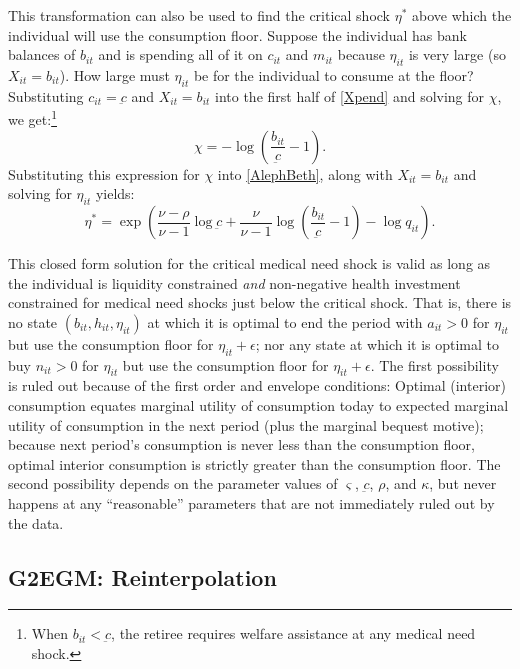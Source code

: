 \documentclass[12pt,pdftex,letterpaper]{article}
\newcommand{\Health}{h}
\newcommand{\Con}{c}
\newcommand{\Care}{m}
\newcommand{\Invst}{n}
\newcommand{\Xpend}{X}
\newcommand{\Bank}{b}
\newcommand{\Assets}{a}
\newcommand{\Copay}{q}
\newcommand{\ConFloor}{\underbar{\Con}}
\newcommand{\LifeUtility}{\varsigma}
\newcommand{\CRRAcon}{\rho}
\newcommand{\CRRAcare}{\nu}
\newcommand{\MedShk}{\eta}
\newcommand{\HealthProdParam}{\kappa}
\begin{document}
This transformation can also be used to find the critical shock $\MedShk^*$ above which the individual will use the consumption floor.  Suppose the individual has bank balances of $\Bank_{it}$ and is spending all of it on $\Con_{it}$ and $\Care_{it}$ because $\MedShk_{it}$ is very large (so $\Xpend_{it} = \Bank_{it}$).  How large must $\MedShk_{it}$ be for the individual to consume at the floor?  Substituting  $\Con_{it} = \ConFloor$ and $\Xpend_{it} = \Bank_{it}$ into the first half of \eqref{Xpend} and solving for $\chi$, we get:\footnote{When $\Bank_{it} < \ConFloor$, the retiree requires welfare assistance at any medical need shock.}
\begin{equation}
\chi = -\log \left( \frac{\Bank_{it}}{\ConFloor} - 1 \right).
\end{equation}
Substituting this expression for $\chi$ into \eqref{AlephBeth}, along with $\Xpend_{it} = \Bank_{it}$ and solving for $\MedShk_{it}$ yields:
\begin{equation}
\MedShk^* = \exp \left( \frac{\CRRAcare - \CRRAcon}{\CRRAcare - 1} \log \ConFloor + \frac{\CRRAcare}{\CRRAcare - 1} \log \left( \frac{\Bank_{it}}{\ConFloor} - 1 \right) - \log \Copay_{it} \right).
\end{equation}

This closed form solution for the critical medical need shock is valid as long as the individual is liquidity constrained \textit{and} non-negative health investment constrained for medical need shocks just below the critical shock.  That is, there is no state $(\Bank_{it},\Health_{it},\MedShk_{it})$ at which it is optimal to end the period with $\Assets_{it} > 0$ for $\MedShk_{it}$ but use the consumption floor for $\MedShk_{it} + \epsilon$; nor any state at which it is optimal to buy $\Invst_{it} > 0$  for $\MedShk_{it}$ but use the consumption floor for $\MedShk_{it} + \epsilon$.  The first possibility is ruled out because of the first order and envelope conditions: Optimal (interior) consumption equates marginal utility of consumption today to expected marginal utility of consumption in the next period (plus the marginal bequest motive); because next period's consumption is never less than the consumption floor, optimal interior consumption is strictly greater than the consumption floor.  The second possibility depends on the parameter values of $\LifeUtility$, $\ConFloor$, $\CRRAcon$, and $\HealthProdParam$, but never happens at any ``reasonable'' parameters that are not immediately ruled out by the data.


\subsection{G2EGM: Reinterpolation}
\label{app:G2EGM}
\end{document}
